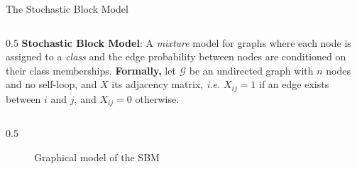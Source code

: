 \documentclass[final]{beamer}
\newlength{\colwidth}
\begin{document}
\begin{frame}[t]
\begin{columns}[t]
\begin{column}{\colwidth}
      \begin{block}{The Stochastic Block Model}
        \begin{column}{0.5\colwidth}
          \justifying
          \textbf{Stochastic Block Model}: A \textit{mixture} model for graphs where each node is assigned to a \textit{class} and the edge probability between nodes are conditioned on their class memberships. %
          \newline\newline
          \textbf{Formally,} let $\mathcal{G}$ be an undirected graph with $n$ nodes and no self-loop, and $X$ its adjacency matrix, \textit{i.e.} $X_{ij} = 1$ if an edge exists between $i$ and $j$, and $X_{ij} = 0$ otherwise.
        \end{column}
        \begin{column}{0.5\colwidth}
          \begin{figure}[H]
            \centering
            \caption{Graphical model of the SBM}
            \label{fig:graphical_model}
          \end{figure}
        \end{column}


\end{block}
\end{column}
\end{columns}
\end{frame}
\end{document}
